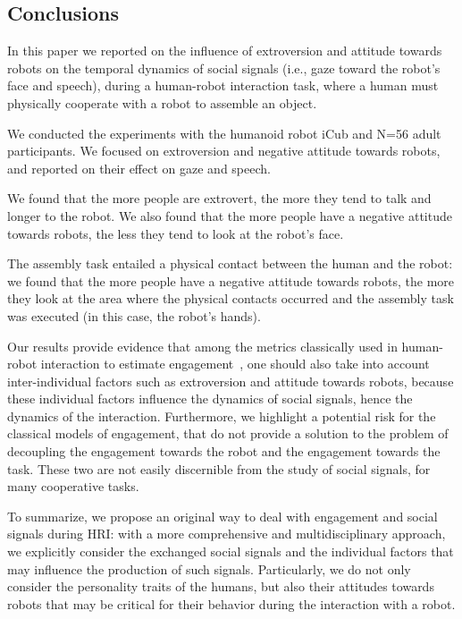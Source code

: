 \subsection{Conclusions}

In this paper we reported on the influence of extroversion and attitude towards robots on the temporal dynamics of social signals (i.e., gaze toward the robot's face and speech), during a human-robot interaction task, where a human must physically cooperate with a robot to assemble an object. 

We conducted the experiments with the humanoid robot iCub and N=56 adult participants. 
We focused on extroversion and negative attitude towards robots, and reported on their effect on gaze and speech.

We found that the more people are extrovert, the more they tend to talk and longer to the robot. We also found that the more people have a negative attitude towards robots, the less they tend to look at the robot's face. 

The assembly task entailed a physical contact between the human and the robot: we found that the more people have a negative attitude towards robots, the more they look at the area where the physical contacts occurred and the assembly task was executed  (in this case, the robot's hands). 

Our results provide evidence that among the metrics classically used in human-robot interaction to estimate engagement~\cite{rich2010recognizing}, one should also take into account inter-individual factors such as extroversion and attitude towards robots, because these individual factors influence the dynamics of social signals, hence the dynamics of the interaction. 
Furthermore, we highlight a potential risk for the classical models of engagement, that do not provide a solution to the problem of decoupling the engagement towards the robot and the engagement towards the task. These two are not easily discernible from the study of social signals, for many cooperative tasks.

To summarize, we propose an original way to deal with engagement and social signals during HRI: with a more comprehensive and multidisciplinary approach, we explicitly consider the exchanged social signals and the individual factors that may influence the production of such signals. Particularly, we do not only consider the personality traits of the humans, but also their attitudes towards robots that may be critical for their behavior during the interaction with a robot. 
  
